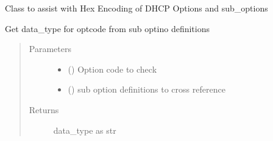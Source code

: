 \documentclass[letterpaper,10pt,english]{sphinxmanual}
\begin{document}
\begin{fulllineitems}
\label{\detokenize{dhcp_decode-class:bloxone.dhcp_decode}}
\sphinxAtStartPar
Class to assist with Hex Encoding of
DHCP Options and sub\_options

\begin{fulllineitems}
\label{\detokenize{dhcp_decode-class:bloxone.dhcp_decode.check_data_type}}
\sphinxAtStartPar
Get data\_type for optcode from sub optino definitions
\begin{quote}\begin{description}
\item[{Parameters}] \leavevmode\begin{itemize}
\item {} 
\sphinxAtStartPar
{} () \textendash{} Option code to check

\item {} 
\sphinxAtStartPar
{} () \textendash{} sub option definitions to cross
reference

\end{itemize}

\item[{Returns}] \leavevmode
\sphinxAtStartPar
data\_type as str

\end{description}\end{quote}

\end{fulllineitems}


\begin{fulllineitems}
\label{\detokenize{dhcp_decode-class:bloxone.dhcp_decode.decode_data}}
\end{fulllineitems}


\end{fulllineitems}
\end{document}
